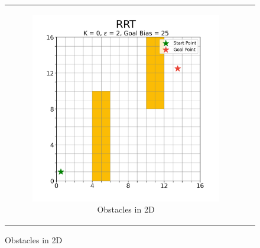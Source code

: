 
\begin{figure}[H]
\begin{centering}
\begin{tabular}{cc}

    \begin{subfigure}{0.47\linewidth}
    \includegraphics[width=\linewidth]{chapters/chapter2/img/visualizing/obstacles2d.png}
    \caption{Obstacles in 2D}
    \end{subfigure} &


\end{tabular}
\end{centering}
\end{figure}
